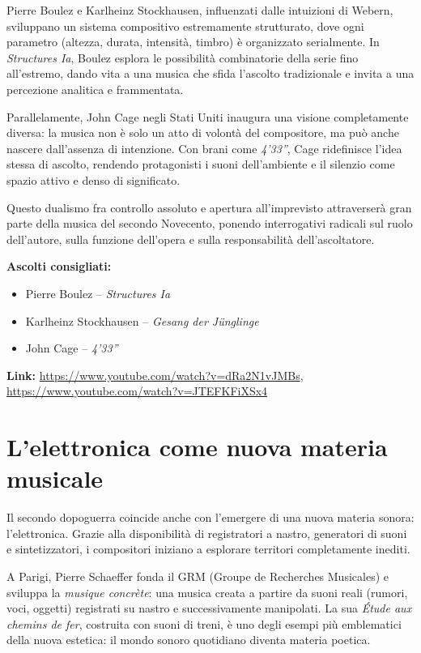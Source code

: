 \documentclass[12pt,a4paper]{article}
\begin{document}
Pierre Boulez e Karlheinz Stockhausen, influenzati dalle intuizioni di Webern, sviluppano un sistema compositivo estremamente strutturato, dove ogni parametro (altezza, durata, intensit\`a, timbro) \`e organizzato serialmente. In \emph{Structures Ia}, Boulez esplora le possibilit\`a combinatorie della serie fino all’estremo, dando vita a una musica che sfida l’ascolto tradizionale e invita a una percezione analitica e frammentata.

Parallelamente, John Cage negli Stati Uniti inaugura una visione completamente diversa: la musica non \`e solo un atto di volont\`a del compositore, ma pu\`o anche nascere dall’assenza di intenzione. Con brani come \emph{4’33”}, Cage ridefinisce l’idea stessa di ascolto, rendendo protagonisti i suoni dell’ambiente e il silenzio come spazio attivo e denso di significato.

Questo dualismo fra controllo assoluto e apertura all’imprevisto attraverser\`a gran parte della musica del secondo Novecento, ponendo interrogativi radicali sul ruolo dell’autore, sulla funzione dell’opera e sulla responsabilit\`a dell’ascoltatore.

\textbf{Ascolti consigliati:}
\begin{itemize}
  \item Pierre Boulez -- \textit{Structures Ia}
  \item Karlheinz Stockhausen -- \textit{Gesang der J\"unglinge}
  \item John Cage -- \textit{4’33”}
\end{itemize}
\textbf{Link:} \url{https://www.youtube.com/watch?v=dRa2N1vJMBs}, \url{https://www.youtube.com/watch?v=JTEFKFiXSx4}

\section{L’elettronica come nuova materia musicale}
Il secondo dopoguerra coincide anche con l’emergere di una nuova materia sonora: l’elettronica. Grazie alla disponibilit\`a di registratori a nastro, generatori di suoni e sintetizzatori, i compositori iniziano a esplorare territori completamente inediti.

A Parigi, Pierre Schaeffer fonda il GRM (Groupe de Recherches Musicales) e sviluppa la \emph{musique concr\`ete}: una musica creata a partire da suoni reali (rumori, voci, oggetti) registrati su nastro e successivamente manipolati. La sua \emph{Étude aux chemins de fer}, costruita con suoni di treni, \`e uno degli esempi pi\`u emblematici della nuova estetica: il mondo sonoro quotidiano diventa materia poetica.
\end{document}
